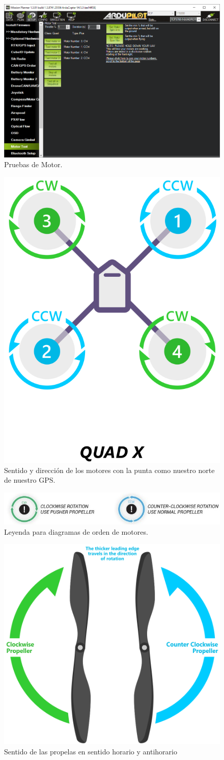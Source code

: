 \begin{figure}[H]
	\centering
	\includegraphics[width=.89\linewidth]{imagenes/motorTest}
	\caption{Pruebas de Motor.}
	\label{fig:motortest}
\end{figure}

\begin{figure}[H]
	\centering
	\includegraphics[width=0.3\linewidth]{imagenes/quadX}
	\caption{Sentido y dirección de los motores con la punta como nuestro norte de nuestro GPS.}
	\label{fig:quadX}
\end{figure}

\begin{figure}[H]
	\centering
	\includegraphics[width=0.9\linewidth]{imagenes/sense}
	\caption{Leyenda para diagramas de orden de motores.}
	\label{fig:sense}
\end{figure}

\begin{figure}[H]
	\centering
	\includegraphics[width=0.5\linewidth]{imagenes/sense2}
	\caption{Sentido de las propelas en sentido horario y antihorario}
	\label{fig:sense2}
\end{figure}

